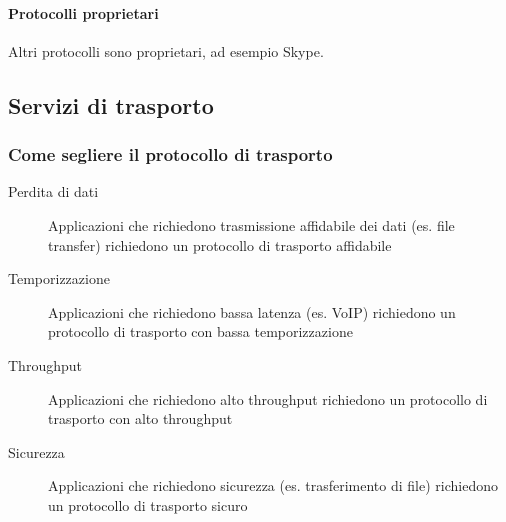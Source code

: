             \paragraph{Protocolli proprietari} Altri protocolli sono proprietari, ad esempio Skype.
    \subsection{Servizi di trasporto}
        \subsubsection{Come segliere il protocollo di trasporto}
            \begin{description}
                \item[Perdita di dati] Applicazioni che richiedono trasmissione affidabile dei dati (es. file transfer) richiedono un protocollo di trasporto affidabile
                \item[Temporizzazione] Applicazioni che richiedono bassa latenza (es. VoIP) richiedono un protocollo di trasporto con bassa temporizzazione
                \item[Throughput] Applicazioni che richiedono alto throughput richiedono un protocollo di trasporto con alto throughput
                \item[Sicurezza] Applicazioni che richiedono sicurezza (es. trasferimento di file) richiedono un protocollo di trasporto sicuro
            \end{description}
